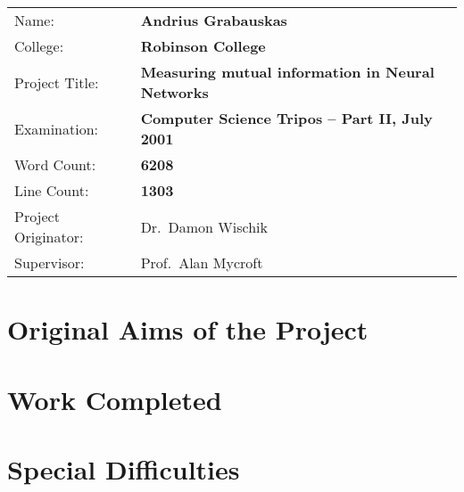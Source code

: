 \documentclass[dissertation.tex]{subfiles}
\begin{document}
{\large
\begin{tabular}{ll}
Name:               & \bf Andrius Grabauskas                    \\
College:            & \bf Robinson College                      \\
Project Title:      & \bf Measuring mutual information in Neural Networks \\
Examination:        & \bf Computer Science Tripos -- Part II, July 2001  \\
Word Count:         & \bf 6208\footnotemark[1] \\
Line Count:         & \bf 1303\footnotemark[2] \\
Project Originator: & Dr.\ Damon Wischik                  \\
Supervisor:         & Prof.\ Alan Mycroft                 \\ 
\end{tabular}
}


\section*{Original Aims of the Project}

\section*{Work Completed}

\section*{Special Difficulties}

\newpage
\end{document}

